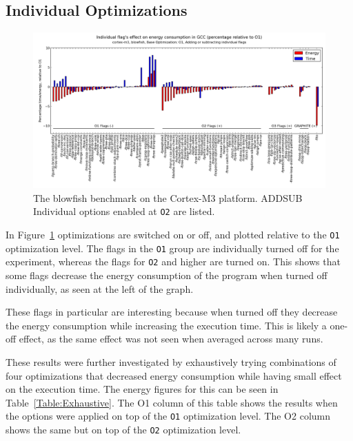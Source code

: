 \documentclass[twocolumn]{article}
\newcommand{\todo}[1]{\textbf{\textcolor{red}{#1}}}
\begin{document}

\subsection{Individual Optimizations}

\begin{figure}[tb]
	\includegraphics[width=\linewidth]{cortex-m3/O1_addsub_blowfish.png}
	\caption{The blowfish benchmark on the Cortex-M3 platform. ADDSUB Individual options enabled at \texttt{O2} are listed.}
	\label{Fig:AddsubO1Blowfish}
\end{figure}

In Figure~\ref{Fig:AddsubO1Blowfish} optimizations are switched on or off, and plotted relative to the \texttt{O1} optimization level. The flags in the \texttt{O1} group are individually turned off for the experiment, whereas the flags for \texttt{O2} and higher are turned on. This shows that some flags decrease the energy consumption of the program when turned off individually, as seen at the left of the graph.

These flags in particular are interesting because when turned off they decrease the energy consumption while increasing the execution time. This is likely a one-off effect, as the same effect was not seen when averaged across many runs.

These results were further investigated by exhaustively trying combinations of four optimizations that decreased energy consumption while having small effect on the execution time. The energy figures for this can be seen in Table~\ref{Table:Exhaustive}. The O1 column of this table shows the results when the options were applied on top of the \texttt{O1} optimization level. The O2 column shows the same but on top of the \texttt{O2} optimization level.
\end{document}
